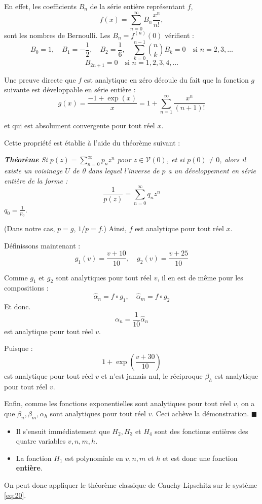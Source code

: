 \documentclass[10pt,french]{beamer}
\begin{document}
	\begin{frame}
		En effet, les coefficients $B_n$ de la série entière représentant $f$, 
		\[
		f(x) = \sum_{n=0}^{\infty} B_n \frac{x^n}{n!},
		\]
		sont les nombres de Bernoulli. 
		Les $B_n = f^{(n)}(0)$ vérifient :
		\[
		B_0 = 1, \quad B_1 = -\frac{1}{2}, \quad B_2 = \frac{1}{6}, \quad \sum_{k=0}^{n-1} \binom{n}{k} B_k = 0 \quad \text{si } n = 2,3,\ldots
		\]
		\[
		B_{2n+1} = 0 \quad \text{si } n = 1, 2, 3, 4, \ldots
		\]
	\end{frame}
	
	\begin{frame}
		Une preuve directe que $f$ est analytique en zéro découle du fait que la fonction $g$ suivante est développable en série entière : 
		\[
		g(x) = \frac{-1 + \exp(x)}{x} = 1 + \sum_{n=1}^{\infty} \frac{x^n}{(n+1)!}
		\]
		
		et qui est absolument convergente pour tout réel $x$.
		
		Cette propriété est établie à l’aide du théorème suivant :
		
		\textit{\textbf{Théorème} Si $p(z) = \sum_{n=0}^{\infty} p_n z^n$ pour $z \in \mathcal{V}(0)$, et si $p(0) \neq 0$, alors il existe un voisinage $U$ de 0 dans lequel l'inverse de $p$ a un développement en série entière de la forme :
			\[
			\frac{1}{p(z)} = \sum_{n=0}^{\infty} q_n z^n
			\]
			\quad {} \quad $q_0 = \frac{1}{p_0}$.
		}
		
		(Dans notre cas, $p = g$, $1/p = f$.) Ainsi, $f$ est analytique pour tout réel $x$.
	\end{frame}
	
	\begin{frame}
		Définissons maintenant :
		\[
		g_1(v) = \frac{v + 10}{10}, \quad g_2(v) = \frac{v + 25}{10}
		\]
		
		Comme $g_1$ et $g_2$ sont analytiques pour tout réel $v$, il en est de même pour les compositions :
		\[
		\hat{\alpha}_n = f \circ g_1, \quad \hat{\alpha}_m = f \circ g_2
		\]
		Et donc.
		\[
		\alpha_n = \frac{1}{10} \hat{\alpha}_n
		\]
		est analytique pour tout réel $v$.
	\end{frame}
	
	\begin{frame}
		Puisque :
		\[
		1 + \exp\left(\frac{v + 30}{10}\right)
		\]
		est analytique pour tout réel $v$ et n’est jamais nul, le réciproque $\beta_h$ est analytique pour tout réel $v$.
		
		Enfin, comme les fonctions exponentielles sont analytiques pour tout réel $v$, on a que $\beta_n, \beta_m, \alpha_h$ sont analytiques pour tout réel $v$. Ceci achève la démonstration. $\blacksquare$
		
		\begin{itemize}
			\item[$\to$] Il s’ensuit immédiatement que $H_2, H_3$ et $H_4$ 
			sont des fonctions entières des quatre variables $v, n, m, h$.
			\item La fonction $H_1$ est polynomiale en $v, n, m$ et $h$ et est donc une fonction \textbf{entière}.
		\end{itemize}
		On peut donc appliquer le théorème classique de Cauchy-Lipschitz sur le système \eqref{eq:20}.
	\end{frame}
	
\end{document}
